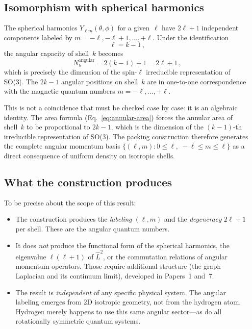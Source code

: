 \documentclass[aps,prl,reprint,amsmath,amssymb]{revtex4-2}
\begin{document}
\subsection{Isomorphism with spherical harmonics}

The spherical harmonics $Y_{\ell m}(\theta, \phi)$ for a given~$\ell$
have $2\ell + 1$ independent components labeled by
$m = -\ell, -\ell+1, \ldots, +\ell$.  Under the identification
\begin{equation}
  \ell = k - 1 \,,
  \label{eq:ell-k}
\end{equation}
the angular capacity of shell~$k$ becomes
\begin{equation}
  N_k^{\mathrm{angular}} = 2(k-1) + 1 = 2\ell + 1 \,,
  \label{eq:2ell-plus-1}
\end{equation}
which is precisely the dimension of the spin-$\ell$ irreducible
representation of SO(3).  The $2k-1$ angular positions on shell~$k$
are in one-to-one correspondence with the magnetic quantum numbers
$m = -\ell, \ldots, +\ell$.

This is not a coincidence that must be checked case by case: it is an
algebraic identity.  The area formula
(Eq.~\ref{eq:annular-area}) forces the annular area of shell~$k$ to
be proportional to $2k-1$, which is the dimension of the
$(k{-}1)$-th irreducible representation of SO(3).  The packing
construction therefore generates the complete angular momentum basis
$\{(\ell, m) : 0 \leq \ell, \; -\ell \leq m \leq \ell\}$ as a direct
consequence of uniform density on isotropic shells.

\subsection{What the construction produces}

To be precise about the scope of this result:

\begin{itemize}
\item The construction produces the \emph{labeling} $(\ell, m)$ and
  the \emph{degeneracy} $2\ell + 1$ per shell.  These are the angular
  quantum numbers.

\item It does \emph{not} produce the functional form of the spherical
  harmonics, the eigenvalue $\ell(\ell+1)$ of $\hat{L}^2$, or the
  commutation relations of angular momentum operators.  Those require
  additional structure (the graph Laplacian and its continuum limit),
  developed in Papers~1 and~7.

\item The result is \emph{independent} of any specific physical
  system.  The angular labeling emerges from 2D isotropic geometry,
  not from the hydrogen atom.  Hydrogen merely happens to use this
  same angular sector---as do all rotationally symmetric quantum
  systems.
\end{itemize}
\end{document}
